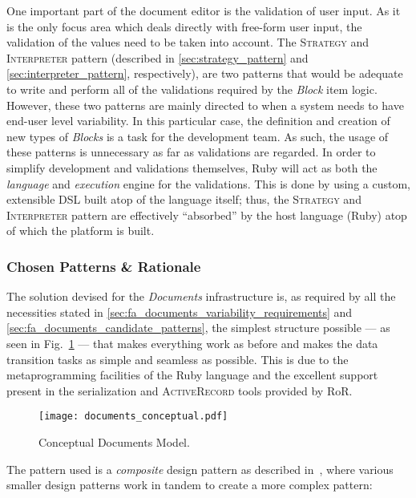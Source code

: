 One important part of the document editor is the validation of user input. As it is the only focus area which deals directly with free-form user input, the validation of the values need to be taken into account. The \textsc{Strategy} and \textsc{Interpreter} pattern (described in \ref{sec:strategy_pattern} and \ref{sec:interpreter_pattern}, respectively), are two patterns that would be adequate to write and perform all of the validations required by the \emph{Block} item logic. However, these two patterns are mainly directed to when a system needs to have end-user level variability. In this particular case, the definition and creation of new types of \emph{Blocks} is a task for the development team. As such, the usage of these patterns is unnecessary as far as validations are regarded. In order to simplify development and validations themselves, Ruby will act as both the \emph{language} and \emph{execution} engine for the validations. This is done by using a custom, extensible DSL built atop of the language itself; thus, the \textsc{Strategy} and \textsc{Interpreter} pattern are effectively ``absorbed'' by the host language (Ruby) atop of which the platform is built.

\subsubsection{Chosen Patterns \& Rationale}\label{sec:fa_documents_chosen_patterns_rationale}

The solution devised for the \emph{Documents} infrastructure is, as required by all the necessities stated in \ref{sec:fa_documents_variability_requirements} and \ref{sec:fa_documents_candidate_patterns}, the simplest structure possible --- as seen in Fig.~\ref{fig:documents_conceptual} --- that makes everything work as before and makes the data transition tasks as simple and seamless as possible. This is due to the metaprogramming facilities of the Ruby language and the excellent support present in the serialization and \textsc{ActiveRecord} tools provided by RoR.

\begin{figure}[H]
  \centering
  \texttt{[image: documents\_conceptual.pdf]}
  \caption{Conceptual Documents Model.}
  \label{fig:documents_conceptual}
\end{figure}

The pattern used is a \emph{composite} design pattern as described in~\cite{riehle_composite_patterns}, where various smaller design patterns work in tandem to create a more complex pattern:

